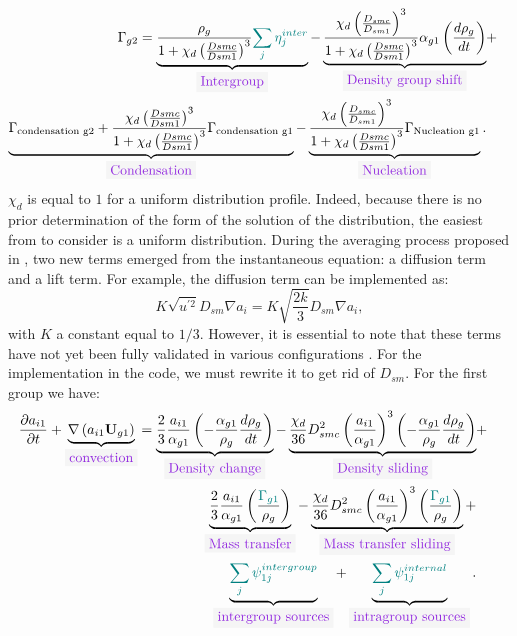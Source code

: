 \begin{equation}
\begin{aligned}
\Gamma_{g2}=\underbrace{\frac{\rho_g}{1+\chi_d \parent{\frac{Dsmc}{Dsm1}}^3}{\color{myteal}\sum_j \eta^{inter}_j}}_{\colorbox{codebackground}{\color{codekeyword3} Intergroup}}- \underbrace{\frac{\chi_d\parent{\frac{D_{smc}}{D_{sm1}}}^3}{1+\chi_d \parent{\frac{Dsmc}{Dsm1}}^3}\alpha_{g1}\parent{\frac{d\rho_{g}}{dt}}}_{\colorbox{codebackground}{\color{codekeyword3} Density\ group\ shift}}&+& \\
\underbrace{\Gamma_{\text{condensation\ g2}}+\frac{\chi_d \parent{\frac{Dsmc}{Dsm1}}^3}{1+\chi_d \parent{\frac{Dsmc}{Dsm1}}^3}\Gamma_{\text{condensation g1}}}_{\colorbox{codebackground}{\color{codekeyword3} Condensation}}-\underbrace{\frac{\chi_d\parent{\frac{D_{smc}}{D_{sm1}}}^3}{1+\chi_d \parent{\frac{Dsmc}{Dsm1}}^3}\Gamma_{\text{Nucleation g1}}}_{\colorbox{codebackground}{\color{codekeyword3} Nucleation}}.
\end{aligned}
\end{equation}
$\chi_d$ is equal to $1$ for a uniform distribution profile. Indeed, because there is no prior determination of the form of the solution of the distribution, the easiest from to consider is a uniform distribution.
During the averaging process proposed in \cite{Kataoka2012} , two new terms emerged from the instantaneous equation: a diffusion term and a lift term. For example, the diffusion term can be implemented as:
\begin{equation}
K\sqrt{u^{\prime 2}}D_{sm}\nabla a_i=K\sqrt{\frac{2k}{3}} D_{sm}\nabla a_i,
\end{equation}
with $K$ a constant equal to $1/3$. However, it is essential to note that these terms have not yet been fully validated in various configurations \cite{Rassame2023}. For the implementation in the code, we must rewrite it to get rid of $D_{sm}$. For the first group we have:
\begin{equation}
\begin{aligned}
\frac{\partial a_{i1}}{\partial t}+\underbrace{\nabla\parent{a_{i1}\mathbf{U}_{g1}}}_{\colorbox{codebackground}{\color{codekeyword3} convection}}=\underbrace{\frac{2}{3}\frac{a_{i1}}{\alpha_{g1}}\parent{-\frac{\alpha_{g1}}{\rho_g}\frac{d \rho_g}{dt}}}_{\colorbox{codebackground}{\color{codekeyword3} Density\ change}}-\underbrace{\frac{\chi_d}{36}D_{smc}^2\parent{\frac{a_{i1}}{\alpha_{g1}}}^3\parent{-\frac{\alpha_{g1}}{\rho_g}\frac{d \rho_g}{dt}}}_{\colorbox{codebackground}{\color{codekeyword3} Density\ sliding}} &+& \\\underbrace{\frac{2}{3}\frac{a_{i1}}{\alpha_{g1}}\parent{\frac{\color{myteal}\Gamma_{g1}}{\rho_g}}}_{\colorbox{codebackground}{\color{codekeyword3} Mass\ transfer}}-\underbrace{\frac{\chi_d}{36}D_{smc}^2\parent{\frac{a_{i1}}{\alpha_{g1}}}^3\parent{\frac{\color{myteal}\Gamma_{g1}}{\rho_g}}}_{\colorbox{codebackground}{\color{codekeyword3} Mass\ transfer\ sliding}}+& \\\underbrace{\color{myteal}\sum_j \psi^{intergroup}_{1j}}_{\colorbox{codebackground}{\color{codekeyword3} intergroup\ sources}}+\underbrace{\color{myteal}\sum_j \psi^{internal}_{1j}}_{\colorbox{codebackground}{\color{codekeyword3} intragroup sources}}.
\end{aligned}
\end{equation}
